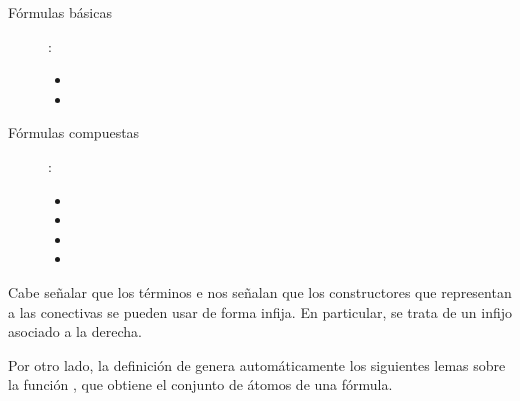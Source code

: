 \begin{isabellebody}
\begin{isamarkuptext}
  \begin{description}
    \item[Fórmulas básicas]:
      \begin{itemize}
        \item {}
        \item {}
      \end{itemize}
    \item [Fórmulas compuestas]:
      \begin{itemize}
        \item {}
        \item {}
        \item {}
        \item {}
      \end{itemize}
  \end{description}

  Cabe señalar que los términos  e  nos señalan que 
  los constructores que representan a las conectivas se pueden usar de
  forma infija. En particular,  se trata de un infijo asociado a 
  la derecha.

  Por otro lado, la definición de  
  genera automáticamente los siguientes lemas sobre la función 
  , que obtiene el conjunto de átomos de una fórmula.


\end{isamarkuptext}
\end{isabellebody}
